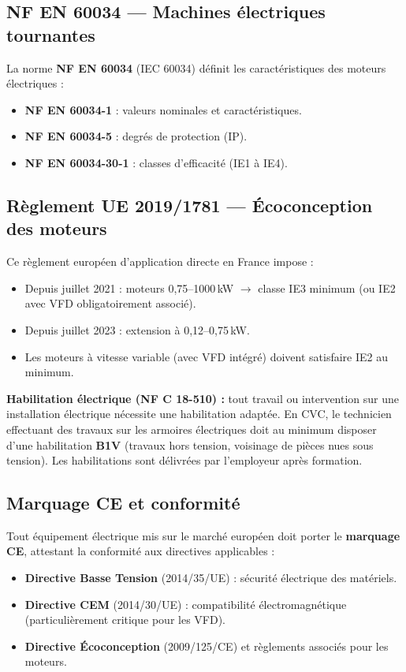 \subsection{NF EN 60034 — Machines électriques tournantes}

La norme \textbf{NF EN 60034} (IEC 60034) définit les caractéristiques des moteurs électriques :
\begin{itemize}
  \item \textbf{NF EN 60034-1} : valeurs nominales et caractéristiques.
  \item \textbf{NF EN 60034-5} : degrés de protection (IP).
  \item \textbf{NF EN 60034-30-1} : classes d'efficacité (IE1 à IE4).
\end{itemize}

\subsection{Règlement UE 2019/1781 — Écoconception des moteurs}

Ce règlement européen d'application directe en France impose :
\begin{itemize}
  \item Depuis juillet 2021 : moteurs 0,75–1000\,kW $\rightarrow$ classe IE3 minimum (ou IE2 avec VFD obligatoirement associé).
  \item Depuis juillet 2023 : extension à 0,12–0,75\,kW.
  \item Les moteurs à vitesse variable (avec VFD intégré) doivent satisfaire IE2 au minimum.
\end{itemize}

\begin{attention}
  \textbf{Habilitation électrique (NF C 18-510) :} tout travail ou intervention sur une installation électrique nécessite une habilitation adaptée. En CVC, le technicien effectuant des travaux sur les armoires électriques doit au minimum disposer d'une habilitation \textbf{B1V} (travaux hors tension, voisinage de pièces nues sous tension). Les habilitations sont délivrées par l'employeur après formation.
\end{attention}

\subsection{Marquage CE et conformité}

Tout équipement électrique mis sur le marché européen doit porter le \textbf{marquage CE}, attestant la conformité aux directives applicables :
\begin{itemize}
  \item \textbf{Directive Basse Tension} (2014/35/UE) : sécurité électrique des matériels.
  \item \textbf{Directive CEM} (2014/30/UE) : compatibilité électromagnétique (particulièrement critique pour les VFD).
  \item \textbf{Directive Écoconception} (2009/125/CE) et règlements associés pour les moteurs.
\end{itemize}


